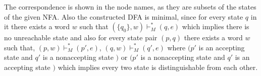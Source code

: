 \documentclass[12pt]{article}
\begin{document}
The correspondence is shown in the node names, as they are subsets of the states of the
given NFA. Also the constructed DFA is minimal, since for every state $q$ in it there exists
a word $w$ such that $(\{q_0\}, w) \vdash_M^* (q, e)$ which implies there is no unreachable
state and also for every state pair $(p,q)$ there exists a word $w$ such that,
$(p,w) \vdash_M^* (p',e)$, $(q,w) \vdash_M^* (q',e)$ where $(p'$ is an accepting state and
$q'$ is a nonaccepting state $)$ or $(p'$ is a nonaccepting state and $q'$ is an accepting
state $)$ which implies every two state is distinguishable from each other.
\end{document}
